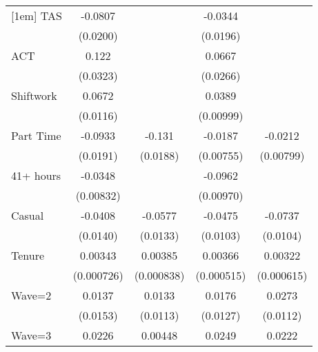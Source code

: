{\begin{tabular}{l*{4}{c}}
[1em]
TAS                 &     -0.0807\sym{***}&                     &     -0.0344         &                     \\
                    &    (0.0200)         &                     &    (0.0196)         &                     \\
[1em]
ACT                 &       0.122\sym{***}&                     &      0.0667\sym{*}  &                     \\
                    &    (0.0323)         &                     &    (0.0266)         &                     \\
[1em]
Shiftwork           &      0.0672\sym{***}&                     &      0.0389\sym{***}&                     \\
                    &    (0.0116)         &                     &   (0.00999)         &                     \\
[1em]
Part Time           &     -0.0933\sym{***}&      -0.131\sym{***}&     -0.0187\sym{*}  &     -0.0212\sym{**} \\
                    &    (0.0191)         &    (0.0188)         &   (0.00755)         &   (0.00799)         \\
[1em]
41+ hours           &     -0.0348\sym{***}&                     &     -0.0962\sym{***}&                     \\
                    &   (0.00832)         &                     &   (0.00970)         &                     \\
[1em]
Casual              &     -0.0408\sym{**} &     -0.0577\sym{***}&     -0.0475\sym{***}&     -0.0737\sym{***}\\
                    &    (0.0140)         &    (0.0133)         &    (0.0103)         &    (0.0104)         \\
[1em]
Tenure              &     0.00343\sym{***}&     0.00385\sym{***}&     0.00366\sym{***}&     0.00322\sym{***}\\
                    &  (0.000726)         &  (0.000838)         &  (0.000515)         &  (0.000615)         \\
[1em]
Wave=2              &      0.0137         &      0.0133         &      0.0176         &      0.0273\sym{*}  \\
                    &    (0.0153)         &    (0.0113)         &    (0.0127)         &    (0.0112)         \\
[1em]
Wave=3              &      0.0226         &     0.00448         &      0.0249         &      0.0222         \\

\end{tabular}}
